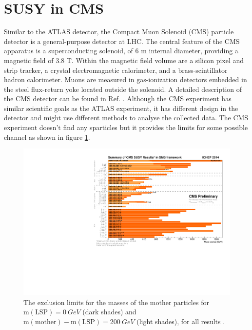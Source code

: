 \documentclass[12pt]{report}
\begin{document}
\section{SUSY in CMS}
Similar to the ATLAS detector, the Compact Muon Solenoid (CMS) particle detector is a general-purpose detector at LHC.
The central feature of the CMS apparatus is a superconducting solenoid, of 6 m internal diameter, providing a magnetic field of 3.8 T.
Within the magnetic field volume are a silicon pixel and strip tracker, a crystal electromagnetic calorimeter, and a brass-scintillator hadron calorimeter.
Muons are measured in gas-ionization detectors embedded in the steel flux-return yoke located outside the solenoid.
A detailed description of the CMS detector can be found in Ref. \cite{cms_detector}.
Although the CMS experiment has similar scientific goals as the ATLAS experiment, it has different design in the detector and might use different methods to analyse the collected data.
The CMS experiment doesn't find any sparticles but it provides the limits for some possible channel as shown in figure \ref{fig: barplot_ICHEP2014}.
\begin{figure}[htbp]
\begin{center}
\includegraphics[scale=1.1, angle=90]{figures/barplot_ICHEP2014.pdf}
\caption{The exclusion limits for the masses of the mother particles for $\mathrm{m(LSP)} = 0 \ GeV$ (dark shades) and $\mathrm{m(mother)} - \mathrm{m(LSP)} = 200 \ GeV$ (light shades), for all results \cite{cms_results}.} %
\label{fig: barplot_ICHEP2014}
\end{center}
\end{figure}
\end{document}
